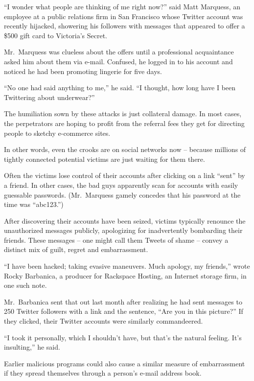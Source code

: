 ﻿\documentclass[12pt]{article}
\begin{document}
``I wonder what people are thinking of me right now?'' said Matt Marquess, an employee at a public
relations firm in San Francisco whose Twitter account was recently hijacked, showering his followers
with messages that appeared to offer a \$500 gift card to Victoria's Secret.

Mr.~Marquess was clueless about the offers until a professional acquaintance asked him about them
via e-mail. Confused, he logged in to his account and noticed he had been promoting lingerie for
five days.

``No one had said anything to me,'' he said. ``I thought, how long have I been Twittering about
underwear?''

The humiliation sown by these attacks is just collateral damage. In most cases, the perpetrators are
hoping to profit from the referral fees they get for directing people to sketchy e-commerce sites.

In other words, even the crooks are on social networks now -- because millions of tightly connected
potential victims are just waiting for them there.

Often the victims lose control of their accounts after clicking on a link ``sent'' by a friend. In
other cases, the bad guys apparently scan for accounts with easily guessable passwords.
(Mr.~Marquess gamely concedes that his password at the time was ``abc123.'')

After discovering their accounts have been seized, victims typically renounce the unauthorized
messages publicly, apologizing for inadvertently bombarding their friends. These messages -- one
might call them Tweets of shame -- convey a distinct mix of guilt, regret and embarrassment.

``I have been hacked; taking evasive maneuvers. Much apology, my friends,'' wrote Rocky Barbanica, a
producer for Rackspace Hosting, an Internet storage firm, in one such note.

Mr.~Barbanica sent that out last month after realizing he had sent messages to 250 Twitter followers
with a link and the sentence, ``Are you in this picture?'' If they clicked, their Twitter accounts
were similarly commandeered.

``I took it personally, which I shouldn't have, but that's the natural feeling. It's insulting,'' he
said.

Earlier malicious programs could also cause a similar measure of embarrassment if they spread
themselves through a person's e-mail address book.
\end{document}

